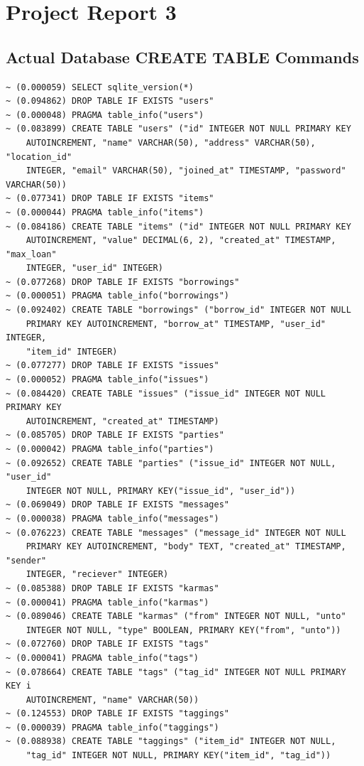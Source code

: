 \documentclass[12pt]{article}
\begin{document}
\section*{Project Report 3}
\subsection*{Actual Database CREATE TABLE Commands}
\begin{verbatim}
~ (0.000059) SELECT sqlite_version(*)
~ (0.094862) DROP TABLE IF EXISTS "users"
~ (0.000048) PRAGMA table_info("users")
~ (0.083899) CREATE TABLE "users" ("id" INTEGER NOT NULL PRIMARY KEY 
    AUTOINCREMENT, "name" VARCHAR(50), "address" VARCHAR(50), "location_id" 
    INTEGER, "email" VARCHAR(50), "joined_at" TIMESTAMP, "password" VARCHAR(50))
~ (0.077341) DROP TABLE IF EXISTS "items"
~ (0.000044) PRAGMA table_info("items")
~ (0.084186) CREATE TABLE "items" ("id" INTEGER NOT NULL PRIMARY KEY 
    AUTOINCREMENT, "value" DECIMAL(6, 2), "created_at" TIMESTAMP, "max_loan" 
    INTEGER, "user_id" INTEGER)
~ (0.077268) DROP TABLE IF EXISTS "borrowings"
~ (0.000051) PRAGMA table_info("borrowings")
~ (0.092402) CREATE TABLE "borrowings" ("borrow_id" INTEGER NOT NULL 
    PRIMARY KEY AUTOINCREMENT, "borrow_at" TIMESTAMP, "user_id" INTEGER, 
    "item_id" INTEGER)
~ (0.077277) DROP TABLE IF EXISTS "issues"
~ (0.000052) PRAGMA table_info("issues")
~ (0.084420) CREATE TABLE "issues" ("issue_id" INTEGER NOT NULL PRIMARY KEY 
    AUTOINCREMENT, "created_at" TIMESTAMP)
~ (0.085705) DROP TABLE IF EXISTS "parties"
~ (0.000042) PRAGMA table_info("parties")
~ (0.092652) CREATE TABLE "parties" ("issue_id" INTEGER NOT NULL, "user_id" 
    INTEGER NOT NULL, PRIMARY KEY("issue_id", "user_id"))
~ (0.069049) DROP TABLE IF EXISTS "messages"
~ (0.000038) PRAGMA table_info("messages")
~ (0.076223) CREATE TABLE "messages" ("message_id" INTEGER NOT NULL 
    PRIMARY KEY AUTOINCREMENT, "body" TEXT, "created_at" TIMESTAMP, "sender" 
    INTEGER, "reciever" INTEGER)
~ (0.085388) DROP TABLE IF EXISTS "karmas"
~ (0.000041) PRAGMA table_info("karmas")
~ (0.089046) CREATE TABLE "karmas" ("from" INTEGER NOT NULL, "unto" 
    INTEGER NOT NULL, "type" BOOLEAN, PRIMARY KEY("from", "unto"))
~ (0.072760) DROP TABLE IF EXISTS "tags"
~ (0.000041) PRAGMA table_info("tags")
~ (0.078664) CREATE TABLE "tags" ("tag_id" INTEGER NOT NULL PRIMARY KEY i
    AUTOINCREMENT, "name" VARCHAR(50))
~ (0.124553) DROP TABLE IF EXISTS "taggings"
~ (0.000039) PRAGMA table_info("taggings")
~ (0.088938) CREATE TABLE "taggings" ("item_id" INTEGER NOT NULL, 
    "tag_id" INTEGER NOT NULL, PRIMARY KEY("item_id", "tag_id"))

\end{verbatim}
\end{document}

